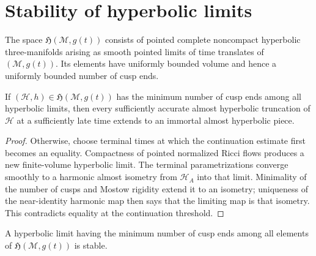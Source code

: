 \section{Stability of hyperbolic limits}

\begin{definition}
\label{def:chow-iv-space-hyperbolic-limits}
The space \(\mathfrak H(\mathcal M,g(t))\) consists of pointed complete
noncompact hyperbolic three-manifolds arising as smooth pointed limits of time
translates of \((\mathcal M,g(t))\).  Its elements have uniformly bounded
volume and hence a uniformly bounded number of cusp ends.
\end{definition}

\begin{proposition}
\label{prop:chow-iv-minimal-cusp-pieces-immortal}
If \((\mathcal H,h)\in\mathfrak H(\mathcal M,g(t))\) has the minimum number
of cusp ends among all hyperbolic limits, then every sufficiently accurate
almost hyperbolic truncation of \(\mathcal H\) at a sufficiently late time
extends to an immortal almost hyperbolic piece.
\end{proposition}

\begin{proof}
\sketch
Otherwise, choose terminal times at which the continuation estimate first
becomes an equality.  Compactness of pointed normalized Ricci flows produces a
new finite-volume hyperbolic limit.  The terminal parametrizations converge
smoothly to a harmonic almost isometry from \(\mathcal H_A\) into that limit.
Minimality of the number of cusps and Mostow rigidity extend it to an isometry;
uniqueness of the near-identity harmonic map then says that the limiting map is
that isometry.  This contradicts equality at the continuation threshold.
\end{proof}

\begin{theorem}
\label{thm:chow-iv-minimal-cusp-limit-stable}
A hyperbolic limit having the minimum number of cusp ends among all elements of
\(\mathfrak H(\mathcal M,g(t))\) is stable.
\end{theorem}

